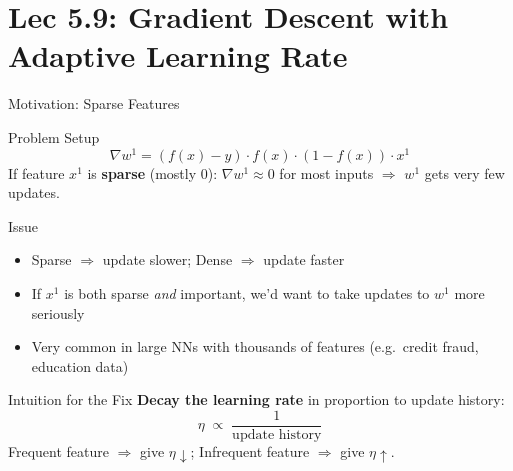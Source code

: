 \documentclass{beamer}
\begin{document}
\section{Lec 5.9: Gradient Descent with Adaptive Learning Rate}

\begin{frame}[shrink=10]{Motivation: Sparse Features}
  \begin{block}{Problem Setup}
    \[
      \nabla w^1 = (f(x)-y)\cdot f(x)\cdot(1-f(x))\cdot x^1
    \]
    If feature $x^1$ is \textbf{sparse} (mostly 0):
    $\nabla w^1 \approx 0$ for most inputs
    $\Rightarrow$ $w^1$ gets very few updates.
  \end{block}

  \medskip

  \begin{alertblock}{Issue}
    \begin{itemize}\setlength\itemsep{5pt}
      \item Sparse $\Rightarrow$ update slower;\quad
            Dense $\Rightarrow$ update faster
      \item If $x^1$ is both sparse \emph{and} important,
            we'd want to take updates to $w^1$ more seriously
      \item Very common in large NNs with thousands of features
            (e.g.\ credit fraud, education data)
    \end{itemize}
  \end{alertblock}

  \medskip

  \begin{exampleblock}{Intuition for the Fix}
    \textbf{Decay the learning rate} in proportion to update history:
    \[
      \eta \;\propto\; \frac{1}{\text{update history}}
    \]
    Frequent feature $\Rightarrow$ give $\eta\!\downarrow$;\quad
    Infrequent feature $\Rightarrow$ give $\eta\!\uparrow$.
  \end{exampleblock}
\end{frame}
\end{document}
